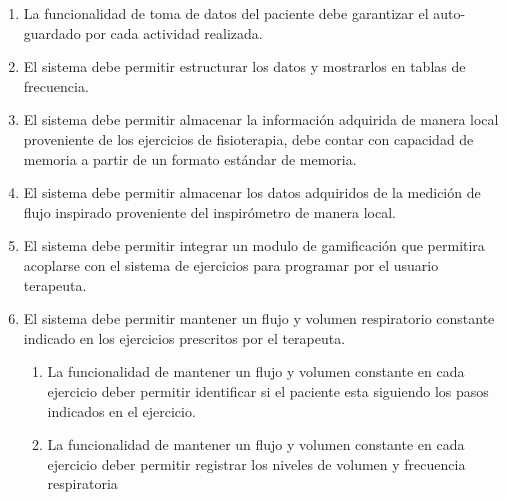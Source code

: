 \documentclass[12pt]{article}
\begin{document}
\begin{enumerate}[start=1,label={\bfseries RF0\arabic*.}]
   
    
    
   
    \item La funcionalidad de toma de datos del paciente debe garantizar el auto-guardado por cada actividad realizada.
    
    \item El sistema debe permitir estructurar los datos y mostrarlos en tablas de frecuencia.
    
    \item El sistema debe permitir almacenar la información adquirida de manera local proveniente de los ejercicios de fisioterapia, debe contar con capacidad de memoria a partir de un formato estándar de memoria.
    
    \item El sistema debe permitir almacenar los datos adquiridos de la medición de flujo inspirado proveniente del inspirómetro de manera local.
    
  
    
    
    \item El sistema debe permitir integrar un modulo de gamificación que permitira acoplarse con el sistema de ejercicios para programar por el usuario terapeuta.
    
     
    
    \item El sistema debe permitir mantener un flujo y volumen respiratorio constante indicado en los ejercicios prescritos por el terapeuta.
    \label{RF21}
            \begin{enumerate}[label*=\arabic*.]
                \item La funcionalidad de mantener un flujo y volumen constante en cada ejercicio deber permitir identificar si el paciente esta siguiendo los pasos indicados en el ejercicio.%
                \item La funcionalidad de mantener un flujo y volumen constante en cada ejercicio deber permitir registrar los niveles de volumen y frecuencia respiratoria 
            \end{enumerate}
    
        


\end{enumerate}
\end{document}
